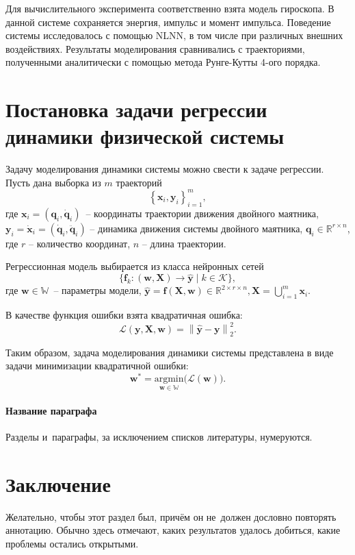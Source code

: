 \documentclass[12pt, twoside]{article}
\begin{document}
Для вычислительного эксперимента соответственно взята модель гироскопа. В данной системе сохраняется энергия, импульс и момент импульса. Поведение системы исследовалось с помощью NLNN, в том числе при различных внешних воздействиях. Результаты моделирования сравнивались с траекториями, полученными аналитически с помощью метода Рунге-Кутты 4-ого порядка.

\section{Постановка задачи регрессии динамики физической системы}
Задачу моделирования динамики системы можно свести к задаче регрессии.
Пусть дана выборка из $m$ траекторий 
$$\left\{\mathbf{x}_i, \mathbf{y}_i\right\}_{i=1}^m,$$ где $\mathbf{x}_i = (\mathbf{q}_i, \mathbf{\dot{q}}_i)$~--  координаты траектории движения двойного маятника, $\mathbf{{y}}_i = \mathbf{\dot{x}}_i = (\mathbf{\dot{q}}_i, \mathbf{\ddot{q}}_i)$ -- динамика движения системы двойного маятника, $\mathbf{q}_i \in \mathbb{R}^{r \times n}$, где $r$ -- количество координат, $n$ -- длина траектории.

Регрессионная модель выбирается из класса нейронных сетей
$$\{\mathbf{f}_k\colon(\mathbf{w}, \mathbf{X})\to  \hat{\mathbf{y}} \mid k \in \mathcal{K}\},$$ где $\mathbf{w} \in \mathbb{W}$~-- параметры модели, $\hat{\mathbf{y}} = \mathbf{f} (\mathbf{X},\mathbf{w}) \in \mathbb{R}^{2\times r \times n}, \mathbf{X} = \bigcup_{i=1}^m \mathbf{x}_i$.

В качестве функция ошибки взята квадратичная ошибка: 
$$\mathcal{L}(\mathbf{y}, \mathbf{X}, \mathbf{w}) =\left\lVert \hat{\mathbf{y}} - \mathbf{y} \right\rVert^{2}_2.$$

Таким образом, задача моделирования динамики системы представлена в виде задачи минимизации квадратичной ошибки: 
$$\textbf{w}^* = \underset{\mathbf{w}\in\mathbb{W}}{\text{argmin}}\bigl(\mathcal{L}(\textbf{w})\bigr).$$
\paragraph{Название параграфа}
Разделы и~параграфы, за исключением списков литературы, нумеруются.

\section{Заключение}
Желательно, чтобы этот раздел был, причём он не~должен дословно повторять аннотацию.
Обычно здесь отмечают, каких результатов удалось добиться, какие проблемы остались открытыми.
\end{document}
